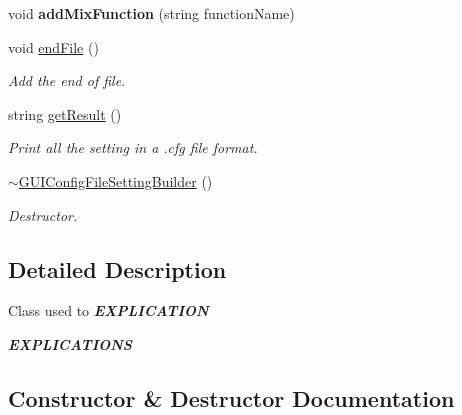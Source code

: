 \begin{DoxyCompactItemize}
\mbox{\label{class_g_u_i_config_file_setting_builder_a1e466ba44507d8298315388ba8f46a2a}} 
void {\bfseries add\+Mix\+Function} (string function\+Name)
\item 
\mbox{\label{class_g_u_i_config_file_setting_builder_ae01b5b185f28404655c78f5800e234e3}} 
void \mbox{\hyperlink{class_g_u_i_config_file_setting_builder_ae01b5b185f28404655c78f5800e234e3}{end\+File}} ()
\begin{DoxyCompactList}\small\item\em Add the end of file. \end{DoxyCompactList}\item 
\mbox{\label{class_g_u_i_config_file_setting_builder_acdddbc479ab7e58b8e46303f47f1bd8a}} 
string \mbox{\hyperlink{class_g_u_i_config_file_setting_builder_acdddbc479ab7e58b8e46303f47f1bd8a}{get\+Result}} ()
\begin{DoxyCompactList}\small\item\em Print all the setting in a .cfg file format. \end{DoxyCompactList}\item 
\mbox{\hyperlink{class_g_u_i_config_file_setting_builder_a45d779dad296769d2877cfeec2fcb60c}{$\sim$\+G\+U\+I\+Config\+File\+Setting\+Builder}} ()
\begin{DoxyCompactList}\small\item\em Destructor. \end{DoxyCompactList}\end{DoxyCompactItemize}


\subsection{Detailed Description}
Class used to {\itshape {\bfseries E\+X\+P\+L\+I\+C\+A\+T\+I\+ON}} 

{\itshape {\bfseries E\+X\+P\+L\+I\+C\+A\+T\+I\+O\+NS}} 

\subsection{Constructor \& Destructor Documentation}
\mbox{\label{class_g_u_i_config_file_setting_builder_a336f849026dd51c1d5baad427bf88b2f}} 
